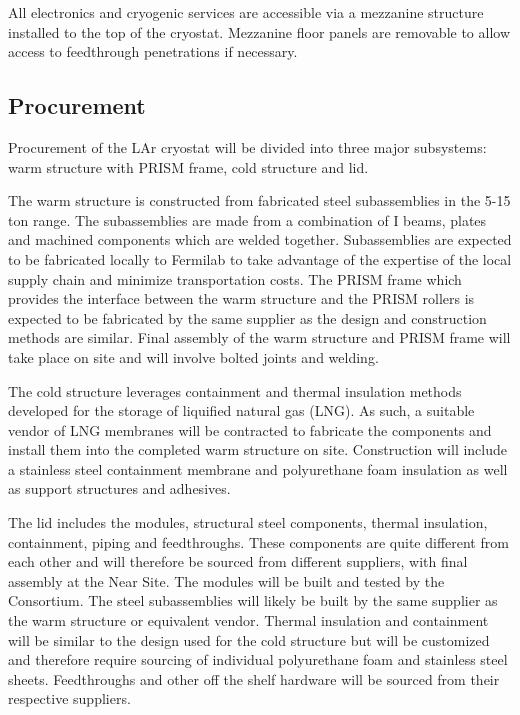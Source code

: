 All electronics and cryogenic services are accessible via a mezzanine structure installed to the top of the cryostat.  Mezzanine floor panels are removable to allow access to feedthrough penetrations if necessary.

\subsection{Procurement}
\label{sec:cryost-proc}

Procurement of the LAr cryostat will be divided into three major subsystems: warm structure with PRISM frame, cold structure and lid.


The warm structure is constructed from fabricated steel subassemblies in the 5-15 ton range. The subassemblies are made from a combination of I beams, plates and machined components which are welded together. Subassemblies are expected to be fabricated locally to Fermilab to take advantage of the expertise of the local supply chain and minimize transportation costs. The PRISM frame which provides the interface between the warm structure and the PRISM rollers is expected to be fabricated by the same supplier as the design and construction methods are similar. Final assembly of the warm structure and PRISM frame will take place on site and will involve bolted joints and welding.

The cold structure leverages containment and thermal insulation methods developed for the storage of liquified natural gas (LNG). As such, a suitable vendor of LNG membranes will be contracted to fabricate the components and install them into the completed warm structure on site. Construction will include a stainless steel containment membrane and polyurethane foam insulation as well as support structures and adhesives.

The lid includes the  modules, structural steel components, thermal insulation, containment, piping and feedthroughs. These components are quite different from each other and will therefore be sourced from different suppliers, with final assembly at the Near Site. The  modules will be built and tested by the  Consortium. The steel subassemblies will likely be built by the same supplier as the warm structure or equivalent vendor. Thermal insulation and containment will be similar to the design used for the cold structure but will be customized and therefore require sourcing of individual polyurethane foam and stainless steel sheets. Feedthroughs and other off the shelf hardware will be sourced from their respective suppliers.

